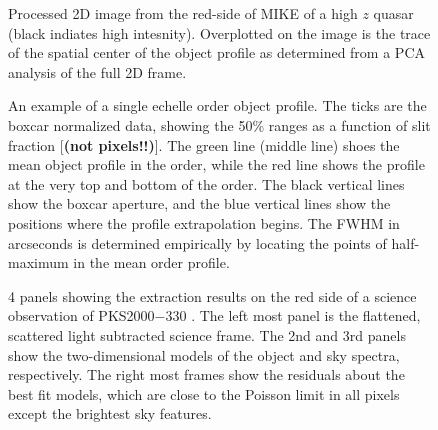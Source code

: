 \documentclass[12pt,preprint]{aastex}
\begin{document}
\begin{figure}
\caption{Processed 2D image from the red-side of MIKE of a high $z$ quasar
(black indiates high intesnity).  Overplotted on the image is the trace
of the spatial center of the object profile as determined from a PCA
analysis of the full 2D frame.
}
\label{fig:trcobj}
\end{figure}

\clearpage

\begin{figure}
\caption{An example of a single echelle order object profile.  The ticks
are the boxcar normalized data, showing the 50\% ranges as a function of
slit fraction [{\bf (not pixels!!)}].  The green line (middle line) shoes the mean
object profile in the order, while the red line shows the profile at the very
top and bottom of the order.
The black vertical lines show the boxcar aperture, and the blue vertical lines
show the positions where the profile extrapolation begins.  The FWHM in arcseconds is determined empirically by locating the points of half-maximum in the 
mean order profile.
}
\label{fig:profile}
\end{figure}

\begin{figure}
\caption{4 panels showing the extraction results on the red side of a
science observation of PKS2000$-$330 \citep[see][]{ppb+07}.  The left most panel
is the flattened, scattered light subtracted science frame.  The 2nd and 3rd
panels show the two-dimensional models of the object and sky spectra, 
respectively.  The right most frames show the residuals about the best fit 
models, which are close to the Poisson limit in all pixels except the brightest
sky features. }
\label{fig:extract}
\end{figure}
\end{document}
